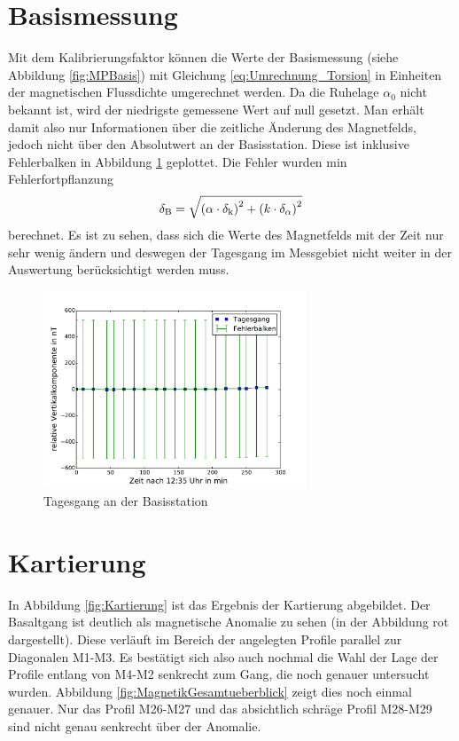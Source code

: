 \section{Basismessung}

Mit dem Kalibrierungsfaktor können die Werte der Basismessung (siehe Abbildung \ref{fig:MPBasis}) mit Gleichung \eqref{eq:Umrechnung_Torsion} in Einheiten der magnetischen Flussdichte umgerechnet werden. Da die Ruhelage $\alpha_0$ nicht bekannt ist, wird der niedrigste gemessene Wert auf null gesetzt. Man erhält damit also nur Informationen über die zeitliche Änderung des Magnetfelds, jedoch nicht über den Absolutwert an der Basisstation. Diese ist inklusive Fehlerbalken in Abbildung \ref{fig:tagesgang} geplottet. Die Fehler wurden min Fehlerfortpflanzung
\begin{equation}
 \delta_{\mathrm{B}}=\sqrt{\left(\alpha\cdot\delta_{\mathrm{k}}\right)^2+\left(k\cdot\delta_{\mathrm{\alpha}}\right)^2}
\end{equation}
berechnet. Es ist zu sehen, dass sich die Werte des Magnetfelds mit der Zeit nur sehr wenig ändern und deswegen der Tagesgang im Messgebiet nicht weiter in der Auswertung berücksichtigt werden muss.

\begin{figure}
 \centering
 \includegraphics[width=0.7\textwidth]{fig/tagesgang}
 \caption{Tagesgang an der Basisstation}
 \label{fig:tagesgang}
\end{figure}

\section{Kartierung}

In Abbildung \ref{fig:Kartierung} ist das Ergebnis der Kartierung abgebildet. Der Basaltgang ist deutlich als magnetische Anomalie zu sehen (in der Abbildung rot dargestellt). Diese verläuft im Bereich der angelegten Profile parallel zur Diagonalen M1-M3. Es bestätigt sich also auch nochmal die Wahl der Lage der Profile entlang von M4-M2 senkrecht zum Gang, die noch genauer untersucht wurden. Abbildung \ref{fig:MagnetikGesamtueberblick} zeigt dies noch einmal genauer. Nur das Profil M26-M27 und das absichtlich schräge Profil M28-M29 sind nicht genau senkrecht über der Anomalie.

